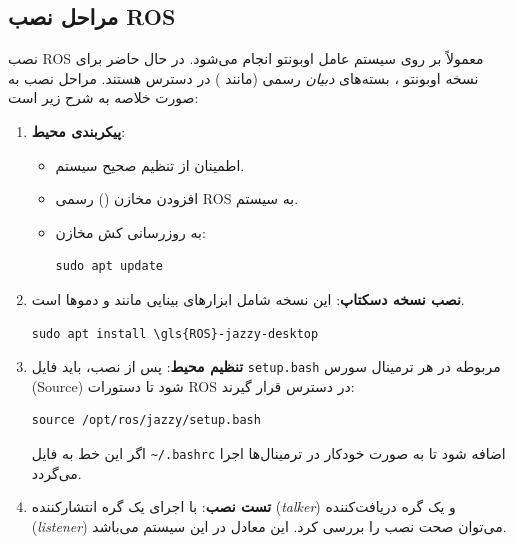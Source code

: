 \documentclass[11pt, a4paper]{article}
\begin{document}
	\subsection{مراحل نصب \gls{ROS}}
	\label{subsec:ros_installation}
	
	نصب \gls{ROS} معمولاً بر روی سیستم عامل اوبونتو 
	 انجام می‌شود. در حال حاضر برای نسخه 
	 اوبونتو
	، بسته‌های 
	\textit{دبیان}
	رسمی
	(مانند 
	) در دسترس هستند. مراحل نصب به صورت خلاصه به شرح زیر است:
	
	\begin{enumerate}
		\item \textbf{پیکربندی محیط}:
		\begin{itemize}
			\item اطمینان از تنظیم صحیح  سیستم.
			\item افزودن مخازن () رسمی \gls{ROS} به سیستم.
			\item به روزرسانی کش مخازن: 
			\begin{LTR}
				\begin{verbatim}sudo apt update\end{verbatim}
			\end{LTR}
		\end{itemize}
		
		\item \textbf{نصب نسخه دسکتاپ}: این نسخه شامل ابزارهای بینایی مانند  و دموها است.
		\begin{LTR}
			\begin{verbatim}sudo apt install \gls{ROS}-jazzy-desktop\end{verbatim}
		\end{LTR}
		
		
		\item \textbf{تنظیم محیط}:
		پس از نصب، باید فایل \texttt{setup.bash} مربوطه در هر ترمینال سورس (Source) شود تا دستورات \gls{ROS} در دسترس قرار گیرند:
		\begin{LTR}
			\begin{verbatim}source /opt/ros/jazzy/setup.bash\end{verbatim}
		\end{LTR}
		اگر این خط به فایل \texttt{\textasciitilde/.bashrc} اضافه شود تا به صورت خودکار در ترمینال‌ها اجرا می‌گردد.
		
		\item \textbf{تست نصب}:
		با اجرای یک گره انتشارکننده (\textit{talker}) و یک گره دریافت‌کننده (\textit{listener}) می‌توان صحت نصب را بررسی کرد. این معادل 
		  در این سیستم می‌باشد.
	\end{enumerate}
	
\end{document}
